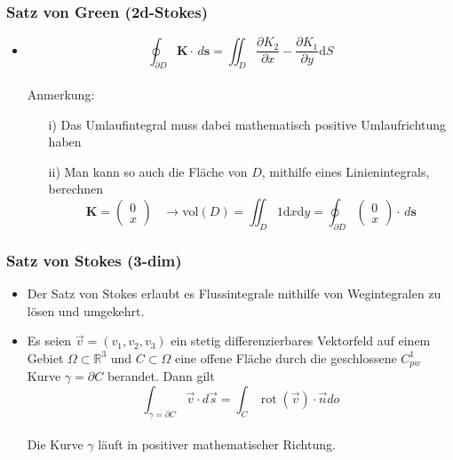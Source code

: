 \documentclass[a3paper, 11pt, landscape]{scrartcl}
\newcommand{\diff}{\,d}
\begin{document}
\begin{multicols*}{3}
    	\subsubsection{Satz von Green (2d-Stokes)}
    		\begin{itemize}
    		    \item \begin{equation*}
    			\oint_{\partial D} \textbf{K} \cdot \diff \textbf{s}=\iint_D \frac{\partial K_2}{\partial x}-\frac{\partial K_1}{\partial y} \text{d}S
    		\end{equation*}\\
    		Anmerkung:
    		\begin{itemize}
    			\item[i)] Das Umlaufintegral muss dabei mathematisch positive Umlaufrichtung haben
    			\item[ii)] Man kann so auch die Fläche von $D$, mithilfe eines Linienintegrals, berechnen
    			\begin{equation*}
    				\textbf{K}=
    				\begin{pmatrix}
    					0\\ x
    				\end{pmatrix}
    				\hspace{10pt} \rightarrow \text{vol}(D)=\iint_D 1 \text{d}x\text{d}y=\oint_{\partial D}
    				\begin{pmatrix}
    				0\\ x
    				\end{pmatrix}
    				\cdot \diff \textbf{s}
    			\end{equation*}
    		\end{itemize}
    		\end{itemize}
    	\subsubsection{Satz von Stokes (3-dim)}
    		\begin{itemize}
                \item Der Satz von Stokes erlaubt es Flussintegrale mithilfe von Wegintegralen zu lösen und umgekehrt.	
	    	    \item Es seien \(\vec{v}=\left(v_{1}, v_{2}, v_{3}\right)\) ein stetig differenzierbares Vektorfeld auf einem Gebiet \(\Omega \subset \mathbb{R}^{3}\) und \(C \subset \Omega\) eine offene Fläche durch die geschlossene \(C_{p w}^{1}\) Kurve \(\gamma=\partial C\) berandet. Dann gilt $$\int_{\gamma=\partial C} \vec{v} \cdot d \vec{s}=\int_{C} \operatorname{rot}(\vec{v}) \cdot \vec{n} d o$$\\
    		    Die Kurve \(\gamma\) läuft in positiver mathematischer Richtung.
    		    

\end{itemize}
\end{multicols*}
\end{document}
